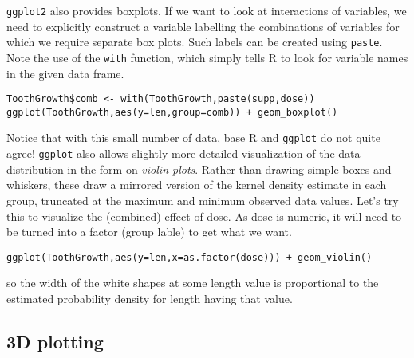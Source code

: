 \documentclass[10pt] {article}
\newcommand{\eps}[3]
{{\begin{center}
 \rotatebox{#1}{\scalebox{#2}{\texttt{[image: \#3]}}}
 \end{center}}
}
\theoremstyle{definition}
\begin{document}
{\tt ggplot2} also provides boxplots. If we want to look at interactions of variables, we need to explicitly construct a variable labelling the combinations of variables for which we require separate box plots. Such labels can be created using {\tt paste}. Note the use of the \lstinline+with+ function, which simply tells R to look for variable names in the given data frame. 
\begin{lstlisting}
ToothGrowth$comb <- with(ToothGrowth,paste(supp,dose))
ggplot(ToothGrowth,aes(y=len,group=comb)) + geom_boxplot()
\end{lstlisting}
\eps{0}{.5}{boxplot2.eps} 
Notice that with this small number of data, base R and {\tt ggplot} do not quite agree! {\tt ggplot} also allows slightly more detailed visualization of the data distribution in the form on {\em violin plots}. Rather than drawing simple boxes and whiskers, these draw a mirrored version of the kernel density estimate in each group, truncated at the maximum and minimum observed data values. Let's try this to visualize the (combined) effect of dose. As dose is numeric, it will need to be turned into a factor (group lable) to get what we want.
\begin{lstlisting}
ggplot(ToothGrowth,aes(y=len,x=as.factor(dose))) + geom_violin()
\end{lstlisting}
\eps{0}{.5}{violin.eps} 
so the width of the white shapes at some length value is proportional to the estimated probability density for length having that value.  
 
\subsection{3D plotting}
\end{document}
